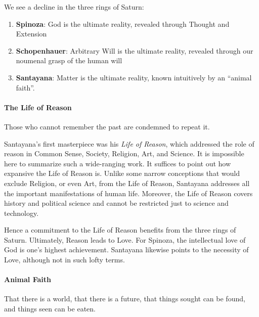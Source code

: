 We see a decline in the three rings of Saturn:

\begin{enumerate}


\item \textbf{Spinoza}: God is the ultimate reality, revealed through Thought and Extension

\item \textbf{Schopenhauer}: Arbitrary Will is the ultimate reality, revealed through our noumenal grasp of the human will

\item \textbf{Santayana}: Matter is the ultimate reality, known intuitively by an ``animal faith''.
\end{enumerate}


\paragraph{The Life of Reason}


\begin{quotex}
Those who cannot remember the past are condemned to repeat it.
\end{quotex}


Santayana's first masterpiece was his \emph{Life of Reason}, which addressed the role of reason in Common Sense, Society, Religion, Art, and Science. It is impossible here to summarize such a wide-ranging work. It suffices to point out how expansive the Life of Reason is. Unlike some narrow conceptions that would exclude Religion, or even Art, from the Life of Reason, Santayana addresses all the important manifestations of human life. Moreover, the Life of Reason covers history and political science and cannot be restricted just to science and technology.

Hence a commitment to the Life of Reason benefits from the three rings of Saturn. Ultimately, Reason leads to Love. For Spinoza, the intellectual love of God is one's highest achievement. Santayana likewise points to the necessity of Love, although not in such lofty terms.

\paragraph{Animal Faith}


\begin{quotex}
That there is a world, that there is a future, that things sought can be found, and things seen can be eaten.
\end{quotex}


